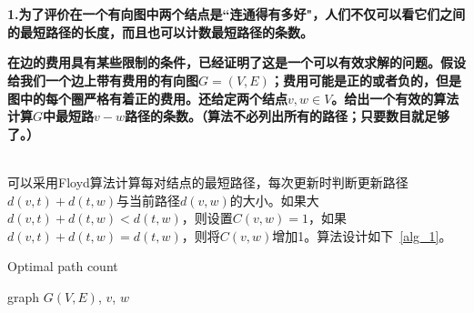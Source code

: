 
\chapter{}
\textbf{
1.为了评价在一个有向图中两个结点是``连通得有多好"，人们不仅可以看它们之间的最短路径的长度，而且也可以计数最短路径的条数。
}

\textbf{
在边的费用具有某些限制的条件，已经证明了这是一个可以有效求解的问题。假设给我们一个边上带有费用的有向图$G=(V,E)$；费用可能是正的或者负的，但是图中的每个圈严格有着正的费用。还给定两个结点$v,w\in V$。给出一个有效的算法计算$G$中最短路$v-w$路径的条数。（算法不必列出所有的路径；只要数目就足够了。）
}

\hspace*{\fill} \\

可以采用Floyd算法计算每对结点的最短路径，每次更新时判断更新路径$d(v,t)+d(t,w)$与当前路径$d(v,w)$的大小。如果大$d(v,t)+d(t,w)<d(t,w)$，则设置$C(v,w)=1$，如果$d(v,t)+d(t,w)=d(t,w)$，则将$C(v,w)$增加1。算法设计如下~\ref{alg_1}。
\begin{algorithm}
\caption{Optimal path count}
\label{alg_1}
\begin{algorithmic}[1]
\REQUIRE graph $G(V,E)$, $v$, $w$
            \ENDIF
        \ENDFOR
    \ENDFOR
\ENDFOR
{}
\end{algorithmic}
\end{algorithm}
